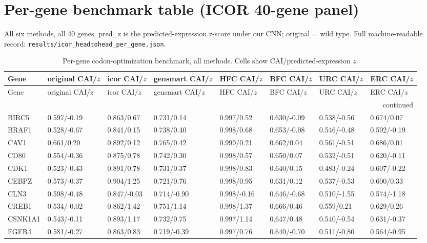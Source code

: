 \section{Per-gene benchmark table (ICOR 40-gene panel)}
All six methods, all 40 genes. pred\_z is the predicted-expression z-score under our CNN; original = wild type. Full machine-readable record: \texttt{results/icor\_headtohead\_per\_gene.json}.
\begin{footnotesize}
\begin{longtable}{llllllll}
\caption{Per-gene codon-optimization benchmark, all methods. Cells show CAI/predicted-expression $z$.}\\
\hline\hline Gene & original CAI/$z$ & icor CAI/$z$ & gensmart CAI/$z$ & HFC CAI/$z$ & BFC CAI/$z$ & URC CAI/$z$ & ERC CAI/$z$ \\ \hline \endfirsthead
\hline\hline Gene & original CAI/$z$ & icor CAI/$z$ & gensmart CAI/$z$ & HFC CAI/$z$ & BFC CAI/$z$ & URC CAI/$z$ & ERC CAI/$z$ \\ \hline \endhead
\hline \multicolumn{8}{r}{continued}\\ \endfoot \hline\hline \endlastfoot
BIRC5 & 0.597/-0.19 & 0.863/0.67 & 0.731/0.14 & 0.997/0.52 & 0.630/-0.09 & 0.538/-0.56 & 0.674/0.07 \\
BRAF1 & 0.528/-0.67 & 0.841/0.15 & 0.738/0.40 & 0.998/0.68 & 0.653/-0.08 & 0.546/-0.48 & 0.592/-0.19 \\
CAV1 & 0.661/0.20 & 0.892/0.12 & 0.765/0.42 & 0.999/0.21 & 0.662/0.04 & 0.561/-0.51 & 0.686/0.01 \\
CD80 & 0.554/-0.36 & 0.875/0.78 & 0.742/0.30 & 0.998/0.57 & 0.650/0.07 & 0.532/-0.51 & 0.620/-0.11 \\
CDK1 & 0.523/-0.43 & 0.891/0.78 & 0.731/0.37 & 0.998/0.83 & 0.640/0.15 & 0.483/-0.24 & 0.607/-0.22 \\
CEBPZ & 0.573/-0.37 & 0.904/1.25 & 0.721/0.76 & 0.998/0.95 & 0.631/0.12 & 0.537/-0.53 & 0.600/0.33 \\
CLN3 & 0.598/-0.48 & 0.847/-0.03 & 0.714/-0.90 & 0.998/-0.16 & 0.646/-0.68 & 0.510/-1.55 & 0.574/-1.18 \\
CREB1 & 0.534/-0.02 & 0.862/1.42 & 0.751/1.14 & 0.998/1.37 & 0.666/0.46 & 0.559/0.21 & 0.629/0.26 \\
CSNK1A1 & 0.543/-0.11 & 0.893/1.17 & 0.732/0.75 & 0.997/1.14 & 0.647/0.48 & 0.540/-0.54 & 0.631/-0.37 \\
FGFR4 & 0.581/-0.27 & 0.863/0.83 & 0.719/-0.39 & 0.997/0.76 & 0.640/-0.70 & 0.511/-0.80 & 0.564/-0.95 \\

\end{longtable}
\end{footnotesize}
